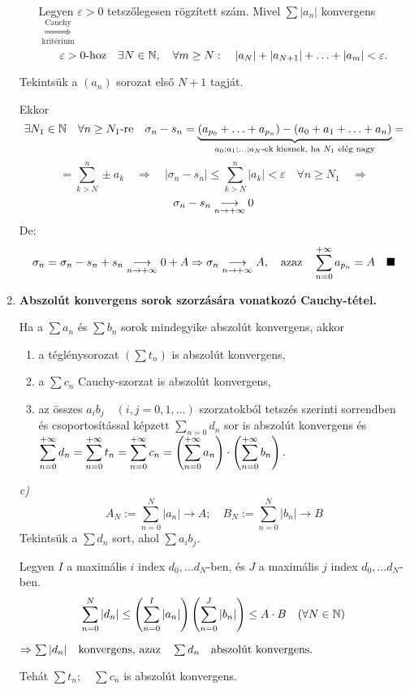\documentclass[a4paper,11.5pt]{article}
\begin{document}
\begin{enumerate}
\begin{enumerate}
			Legyen $\varepsilon>0$ tetszőlegesen rögzített szám. Mivel $\displaystyle\sum|a_n|$ konvergens $\overset{\text{Cauchy}}{\underset{\text{kritérium}}{\Longrightarrow}}$
			\[\varepsilon>0\text{-hoz}\quad \exists N\in \mathbb{N},\quad \forall m\geq N:\quad |a_N|+|a_{N+1}|+\ldots+|a_m|<\varepsilon.\]
		\end{enumerate}
		Tekintsük a $(a_n)$ sorozat első $N+1$ tagját.
		
		Ekkor \[\exists N_1\in\mathbb{N}\quad \forall n\geq N_1\text{-re}\quad \sigma_n-s_n=\underbrace{(a_{p_0}+\ldots+a_{p_n})-(a_0+a_1+\ldots+a_n)}_{a_0;a_1;\ldots;a_N\text{-ek kiesnek, ha $N_1$ elég nagy}}=\]
		\[=\sum_{k>N}^n\pm a_k \quad \Rightarrow\quad |\sigma_n-s_n|\leq\sum_{k>N}^n|a_k|<\varepsilon\quad \forall n\geq N_1\quad \Rightarrow\]
		\[\sigma_n - s_n\underset{n\rightarrow+\infty}{\longrightarrow} 0\]
		De:\[ \sigma_n=\sigma_n-s_n+s_n\underset{n\rightarrow+\infty}{\longrightarrow}0+A\Rightarrow \sigma_n\underset{n\rightarrow+\infty}{\longrightarrow} A,\quad  \text{azaz}\quad \displaystyle\sum_{n=0}^{+\infty} a_{p_n}=A\quad \blacksquare \]
		
		\item \textbf{Abszolút konvergens sorok szorzására vonatkozó Cauchy-tétel.}
		
		Ha a $\sum a_n$ és $\sum b_n$ sorok mindegyike abszolút konvergens, akkor 
		\begin{enumerate}
			\item a téglénysorozat $(\sum t_n)$ is abszolút konvergens,
			\item a $\sum c_n$ Cauchy-szorzat is abszolút konvergens,
			\item az összes $a_ib_j \quad (i,j=0,1,\ldots)$ szorzatokból tetszés szerinti sorrendben és csoportosítással képzett $\displaystyle\sum_{n=0} d_n$ sor is abszolút konvergens és $\displaystyle\sum_{n=0}^{+\infty} d_n=\displaystyle\sum_{n=0}^{+\infty} t_n=\displaystyle\sum_{n=0}^{+\infty} c_n=\left(\displaystyle\sum_{n=0}^{+\infty} a_n\right)\cdot\left(\displaystyle\sum_{n=0}^{+\infty} b_n\right).$
		\end{enumerate}
		
		\biz \textit{c)} 
		\[ A_N:=\sum_{n=0}^N|a_n|\rightarrow A;\quad B_N:=\sum_{n=0}^N|b_n|\rightarrow B \]
		Tekintsük a $\sum d_n$ sort, ahol $\sum a_ib_j$. 
		
		Legyen $I$ a maximális $i$ index $d_0,\ldots d_N$-ben, és $J$ a maximális $j$ index $d_0,\ldots d_N$-ben.
		\[ \sum_{n=0}^N|d_n|\leq \left(\sum_{n=0}^I|a_n|\right)\left(\sum_{n=0}^J|b_n|\right)\leq A\cdot B \quad(\forall N\in \mathbb{N}) \]
		
		$\Rightarrow \sum|d_n| \text{\quad konvergens, azaz}\quad \sum d_n \quad\text{abszolút konvergens.}$
		
		Tehát $\sum t_n; \quad\sum c_n$ \quad is abszolút konvergens.
		

\end{enumerate}
\end{document}
